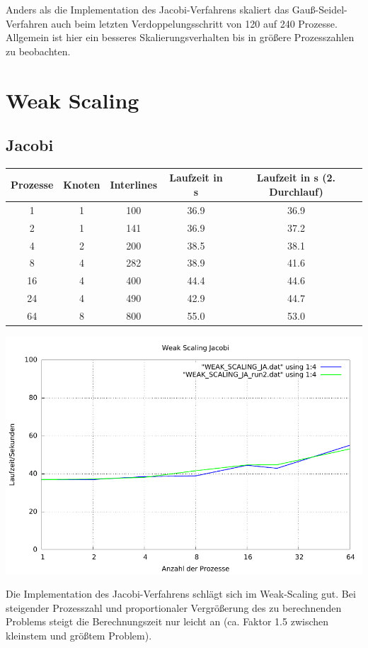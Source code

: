 \documentclass[a4paper]{article}
\begin{document}
Anders als die Implementation des Jacobi-Verfahrens skaliert das Gauß-Seidel-Verfahren auch beim letzten Verdoppelungsschritt von 120 auf 240 Prozesse. Allgemein ist hier ein besseres Skalierungsverhalten bis in größere Prozesszahlen zu beobachten. 

\section{Weak Scaling}
\subsection{Jacobi}
\begin{tabular}{|c|c|c|c|c|}
\hline 
Prozesse & Knoten & Interlines & Laufzeit in s & Laufzeit in s (2. Durchlauf) \\ 
\hline 
1 & 1 & 100 & 36.9 & 36.9 \\ 
\hline 
2 & 1 & 141 & 36.9 & 37.2 \\ 
\hline 
4 & 2 & 200 & 38.5 & 38.1 \\ 
\hline 
8 & 4 & 282 & 38.9 & 41.6 \\ 
\hline 
16 & 4 & 400 & 44.4 & 44.6 \\ 
\hline 
24 & 4 & 490 & 42.9 & 44.7 \\ 
\hline 
64 & 8 & 800 & 55.0 & 53.0 \\ 
\hline 
\end{tabular} 

\includegraphics[scale=0.8]{img/WEAK_SCALING_JA_laufzeit.pdf}

Die Implementation des Jacobi-Verfahrens schlägt sich im Weak-Scaling gut. Bei steigender Prozesszahl und proportionaler Vergrößerung des zu berechnenden Problems steigt die Berechnungszeit nur leicht an (ca. Faktor 1.5 zwischen kleinstem und größtem Problem). 
\end{document}
